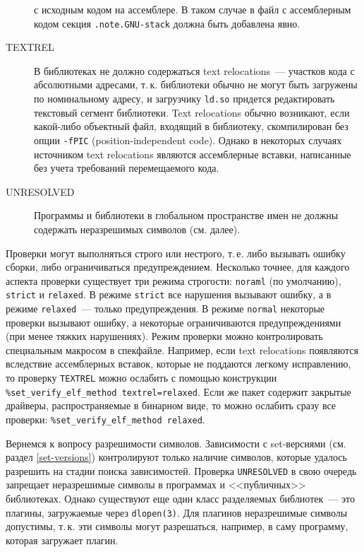 \documentclass[russian,a4paper,12pt,titlepage]{article}
\begin{document}
\begin{description}
с исходным кодом на ассемблере.  В таком случае в файл с ассемблерным кодом секция \verb|.note.GNU-stack| должна быть добавлена явно.
\item[TEXTREL] В библиотеках не должно содержаться text relocations~--- участков кода с абсолютными адресами, т.\,к. библиотеки
обычно не могут быть загружены по номинальному адресу, и загрузчику \verb|ld.so| придется редактировать текстовый сегмент библиотеки.
Text relocations обычно возникают, если какой-либо объектный файл, входящий в библиотеку, скомпилирован без опции \verb|-fPIC|
(position-independent code).  Однако в некоторых случаях источником text relocations являются ассемблерные вставки, написанные
без учета требований перемещаемого кода.
\item[UNRESOLVED] Программы и библиотеки в глобальном пространстве имен не должны содержать неразрешимых символов (см. далее).
\end{description}

Проверки могут выполняться строго или нестрого, т.\,е. либо вызывать ошибку сборки, либо ограничиваться предупреждением.
Несколько точнее, для каждого аспекта проверки существует три режима строгости: \verb|noraml| (по умолчанию), \verb|strict|
и \verb|relaxed|.  В режиме \verb|strict| все нарушения вызывают ошибку, а в режиме \verb|relaxed|~--- только предупреждения.
В режиме \verb|normal| некоторые проверки вызывают ошибку, а некоторые ограничиваются предупреждениями (при менее тяжких нарушениях).
Режим проверки можно контролировать специальным макросом в спекфайле.  Например, если text relocations появляются вследствие
ассемблерных вставок, которые не поддаются легкому исправлению, то проверку \verb|TEXTREL| можно ослабить с помощью конструкции
\verb|%set_verify_elf_method textrel=relaxed|.
Если же пакет содержит закрытые драйверы, распространяемые в бинарном виде, то можно ослабить сразу все проверки:
\verb|%set_verify_elf_method relaxed|.

Вернемся к вопросу разрешимости символов.  Зависимости с set-версиями (см. раздел \ref{set-versions})
контролируют только наличие символов, которые удалось разрешить на стадии поиска зависимостей.  Проверка \verb|UNRESOLVED|
в свою очередь запрещает неразрешимые символы в программах и <<публичных>> библиотеках.  Однако существуют
еще один класс разделяемых библиотек~--- это плагины, загружаемые через \verb|dlopen(3)|.  Для плагинов неразрешимые
символы допустимы, т.\,к. эти символы могут разрешаться, например, в саму программу, которая загружает плагин.
\end{document}
